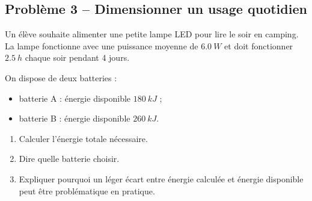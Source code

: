 \documentclass[11pt,a4paper]{article}
\begin{document}
\subsection{Problème 3 -- Dimensionner un usage quotidien}

\begin{enoncebox}
Un élève souhaite alimenter une petite lampe LED pour lire le soir en camping.  
La lampe fonctionne avec une puissance moyenne de \(\SI{6.0}{W}\) et doit fonctionner \(\SI{2.5}{h}\) chaque soir pendant 4 jours.

On dispose de deux batteries :
\begin{itemize}
    \item batterie A : énergie disponible \(\SI{180}{kJ}\) ;
    \item batterie B : énergie disponible \(\SI{260}{kJ}\).
\end{itemize}

\begin{enumerate}[label=\arabic*)]
    \item Calculer l'énergie totale nécessaire.
    \item Dire quelle batterie choisir.
    \item Expliquer pourquoi un léger écart entre énergie calculée et énergie disponible peut être problématique en pratique.
\end{enumerate}
\end{enoncebox}
\end{document}
